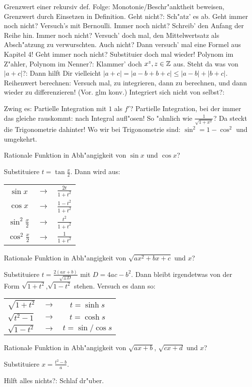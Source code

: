 \trick Grenzwert einer rekursiv def. Folge:{
  Monotonie/Beschr"anktheit beweisen, Grenzwert durch Einsetzen in Definition.
  }
\trick Geht nicht?:{
  Sch"atz' es ab. Geht immer noch nicht? Versuch's mit Bernoulli.
  Immer noch nicht? Schreib' den Anfang der Reihe hin. Immer noch nicht?
  Versuch' doch mal, den Mittelwertsatz als Absch"atzung zu verwurschten.
  Auch nicht? Dann versuch' mal eine Formel aus Kapitel 4! Geht immer 
  noch nicht? Substituier doch mal wieder!
  }
\trick Polynom im Z"ahler, Polynom im Nenner?:{
  Klammer' doch $x^z,z\in\mathbb Z$ aus.
  }
\trick Steht da was von $|a+c|$?:{
  Dann hilft Dir vielleicht $|a+c|=|a-b+b+c|\le|a-b|+|b+c|$.
  }
\trick Reihenwert berechnen:{
  Versuch mal, zu integrieren, dann zu berechnen, und dann wieder zu 
  differenzieren! (Vor. glm konv.)
  }
\trick Integriert sich nicht von selbst?:{
  Zwing es: Partielle Integration mit $1$ als $f'$? Partielle Integration,
  bei der immer das gleiche rauskommt: nach Integral aufl"osen!
  So "ahnlich wie $\frac 1{\sqrt{1+x^2}}$? Da steckt die Trigonometrie dahinter!
  Wo wir bei Trigonometrie sind: $\sin^2=1-\cos^2$ und umgekehrt.
  
  Rationale Funktion in Abh"angigkeit von $\sin x$ und $\cos x$? 
  
  Substituiere $t=\tan \frac x 2$. Dann wird aus:
  
  \begin{tabular}{ccc}
    $\sin x$ &$\to$& $\frac{2t}{1+t^2}$ \\
    $\cos x$ &$\to$& $\frac{1-t^2}{1+t^2}$ \\
    $\sin^2 \frac x 2$ &$\to$& $\frac{t^2}{1+t^2}$ \\
    $\cos^2 \frac x 2$ &$\to$& $\frac{1}{1+t^2}$ \\
    \end{tabular}
  
  Rationale Funktion in Abh"angigkeit von $\sqrt{ax^2+bx+c}$ und $x$?
  
  Substituiere $t=\frac{2(ax+b)}{\sqrt{\pm D}}$ mit $D=4ac-b^2$. 
  Dann bleibt irgendetwas von der Form $\sqrt{1+t^2}$,$\sqrt{1-t^2}$ stehen.
  Versuch es dann so:
  
  \begin{tabular}{ccc}
    $\sqrt{1+t^2}$ &$\to$& $t=\sinh s$ \\
    $\sqrt{t^2-1}$ &$\to$& $t=\cosh s$ \\
    $\sqrt{1-t^2}$ &$\to$& $t=\sin/\cos s$
    \end{tabular}
  
  Rationale Funktion in Abh"angigkeit von $\sqrt{ax+b}$, $\sqrt{cx+d}$ und $x$?

  Substituiere $x=\frac{t^2-b}a$.  
  }
\trick Hilft alles nichts?:{
  Schlaf dr"uber.
  }
